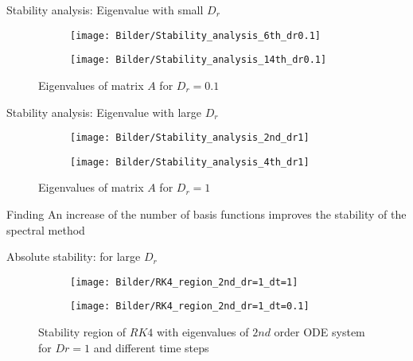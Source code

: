 \begin{frame}{Stability analysis: Eigenvalue with small $D_r$}
	\begin{figure}
		\begin{subfigure}{0.48\textwidth}
			\texttt{[image: Bilder/Stability\_analysis\_6th\_dr0.1]}
		\end{subfigure}
		\hfill
		\begin{subfigure}{0.48\textwidth}
			\texttt{[image: Bilder/Stability\_analysis\_14th\_dr0.1]}
		\end{subfigure}
		\caption{Eigenvalues of matrix $A$ for $D_r = 0.1$}
	\end{figure}
\end{frame}

\begin{frame}{Stability analysis: Eigenvalue with large $D_r$}
	\begin{figure}
		\begin{subfigure}{0.48\textwidth}
			\texttt{[image: Bilder/Stability\_analysis\_2nd\_dr1]}
		\end{subfigure}
		\hfill
		\begin{subfigure}{0.48\textwidth}
			\texttt{[image: Bilder/Stability\_analysis\_4th\_dr1]}
		\end{subfigure}
		\caption{Eigenvalues of matrix $A$ for $D_r = 1$}
	\end{figure}
	\begin{block}{Finding}
	An increase of the number of basis functions improves the stability of the spectral method
\end{block}
\end{frame}

\begin{frame}{Absolute stability: for large $D_r$}
	\begin{figure}
		\begin{subfigure}{0.48\textwidth}
			\texttt{[image: Bilder/RK4\_region\_2nd\_dr=1\_dt=1]}
		\end{subfigure}
		\hfill
		\begin{subfigure}{0.48\textwidth}
			\texttt{[image: Bilder/RK4\_region\_2nd\_dr=1\_dt=0.1]}
		\end{subfigure}
		\caption{Stability region of $RK4$ with eigenvalues of $2nd$ order ODE system for $Dr=1$ and different time steps}
	\end{figure}
\end{frame}


